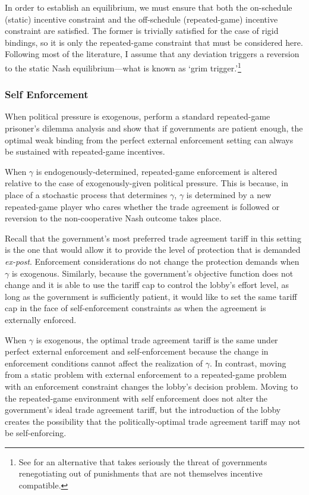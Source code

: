 \documentclass[12pt]{article}
\newcommand{\ga}{\gamma}
\begin{document}
In order to establish an equilibrium, we must ensure that both the on-schedule (static) incentive constraint and the off-schedule (repeated-game) incentive constraint are satisfied. The former is trivially satisfied for the case of rigid bindings, so it is only the repeated-game constraint that must be considered here. Following most of the literature, I assume that any deviation triggers a reversion to the static Nash equilibrium---what is known as `grim trigger.'\footnote{See \Textcite{krw} for an alternative that takes seriously the threat of governments renegotiating out of punishments that are not themselves incentive compatible.\label{fn:krw}}
	
\subsubsection{Self Enforcement}
\label{sec:selfweak}
When political pressure is exogenous, \Textcite{bs2005} perform a standard repeated-game prisoner's dilemma analysis and show that if governments are patient enough, the optimal weak binding from the perfect external enforcement setting can always be sustained with repeated-game incentives.

When $\ga$ is endogenously-determined, repeated-game enforcement is altered relative to the case of exogenously-given political pressure. This is because, in place of a stochastic process that determines $\ga$, $\ga$ is determined by a new repeated-game player who cares whether the trade agreement is followed or reversion to the non-cooperative Nash outcome takes place.

Recall that the government's most preferred trade agreement tariff in this setting is the one that would allow it to provide the level of protection that is demanded \textit{ex-post}. Enforcement considerations do not change the protection demands when $\ga$ is exogenous. Similarly, because the government's objective function does not change and it is able to use the tariff cap to control the lobby's effort level, as long as the government is sufficiently patient, it would like to set the same tariff cap in the face of self-enforcement constraints as when the agreement is externally enforced.

When $\ga$ is exogenous, the optimal trade agreement tariff is the same under perfect external enforcement and self-enforcement because the change in enforcement conditions cannot affect the realization of $\ga$. In contrast, moving from a static problem with external enforcement to a repeated-game problem with an enforcement constraint changes the lobby's decision problem. Moving to the repeated-game environment with self enforcement does not alter the government's ideal trade agreement tariff, but the introduction of the lobby creates the possibility that the politically-optimal trade agreement tariff may not be self-enforcing.
\end{document}
